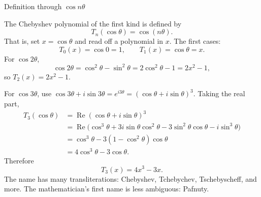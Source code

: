 \documentclass[11pt]{beamer}
\begin{document}
\begin{frame}[allowframebreaks]{Definition through $\cos n\theta$}
\footnotesize

The Chebyshev polynomial of the first kind is defined by
\begin{equation}
  T_n(\cos\theta)=\cos(n\theta).
  \label{eq:cheby-def}
\end{equation}
That is, set $x=\cos\theta$ and read off a polynomial in $x$. The first cases:
\[
  T_0(x) = \cos 0 = 1,
  \qquad T_1(x) = \cos\theta = x .
\]
For $\cos 2\theta$,
\[
  \cos 2\theta = \cos^2\theta - \sin^2\theta = 2\cos^2\theta - 1 = 2x^2 - 1,
\]
so $T_2(x)=2x^2-1$.


For $\cos 3\theta$, use $\cos 3\theta+i\sin 3\theta
=e^{i3\theta}=(\cos\theta+i\sin\theta)^3$. Taking the real part,
\begin{align*}
  T_3(\cos\theta)
   &= \operatorname{Re}(\cos\theta+i\sin\theta)^3 \\
   &= \operatorname{Re}\bigl(\cos^3\theta + 3i\sin\theta\cos^2\theta
        - 3\sin^2\theta\cos\theta - i\sin^3\theta\bigr) \\
   &= \cos^3\theta - 3(1-\cos^2\theta)\cos\theta \\
   &= 4\cos^3\theta - 3\cos\theta .
\end{align*}
Therefore
\begin{equation}
  T_3(x) = 4x^3 - 3x .
  \label{eq:T3}
\end{equation}
\medskip
The name has many transliterations: Chebyshev, Tchebychev, Tschebyscheff, and more. The
mathematician's first name is less ambiguous: Pafnuty.
\end{frame}
\end{document}
